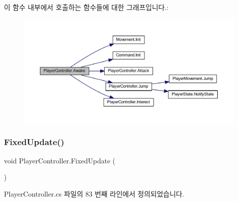 이 함수 내부에서 호출하는 함수들에 대한 그래프입니다.\+:
\nopagebreak
\begin{figure}[H]
\begin{center}
\leavevmode
\includegraphics[width=350pt]{dc/dde/class_player_controller_a050967f0e5c2340cb21861e4c8c788a1_cgraph}
\end{center}
\end{figure}
\mbox{\label{class_player_controller_ae5bdb1b48571f67c3f722a58b6f404d4}} 
\subsubsection{\texorpdfstring{FixedUpdate()}{FixedUpdate()}}
{\footnotesize\ttfamily void Player\+Controller.\+Fixed\+Update (\begin{DoxyParamCaption}{ }\end{DoxyParamCaption})\hspace{0.3cm}{\ttfamily [private]}}



Player\+Controller.\+cs 파일의 83 번째 라인에서 정의되었습니다.


